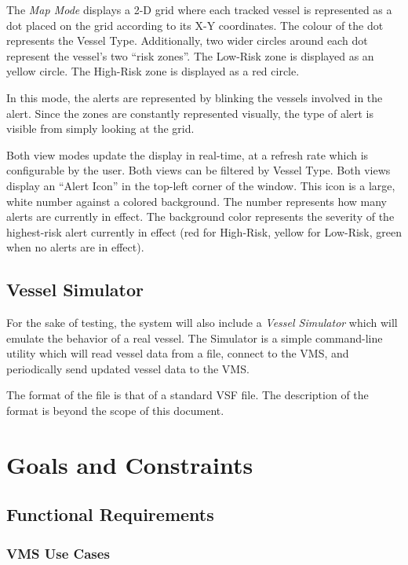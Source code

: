 \documentclass{article}
\begin{document}
The \emph{Map Mode} displays a 2-D grid where each tracked vessel is represented as a dot placed on the grid according to its X-Y coordinates. The colour of the dot represents the Vessel Type. Additionally, two wider circles around each dot represent the vessel's two ``risk zones''. The Low-Risk zone is displayed as an yellow circle. The High-Risk zone is displayed as a red circle.

In this mode, the alerts are represented by blinking the vessels involved in the alert. Since the zones are constantly represented visually, the type of alert is visible from simply looking at the grid.

Both view modes update the display in real-time, at a refresh rate which is configurable by the user. Both views can be filtered by Vessel Type. Both views display an ``Alert Icon'' in the top-left corner of the window. This icon is a large, white number against a colored background. The number represents how many alerts are currently in effect. The background color represents the severity of the highest-risk alert currently in effect (red for High-Risk, yellow for Low-Risk, green when no alerts are in effect).

\subsection{Vessel Simulator}

For the sake of testing, the system will also include a \emph{Vessel Simulator} which will emulate the behavior of a real vessel. The Simulator is a simple command-line utility which will read vessel data from a file, connect to the VMS, and periodically send updated vessel data to the VMS.

The format of the file is that of a standard VSF file. The description of the format is beyond the scope of this document.

\section{Goals and Constraints} %

\subsection{Functional Requirements} %


\subsubsection{VMS Use Cases}
\end{document}
